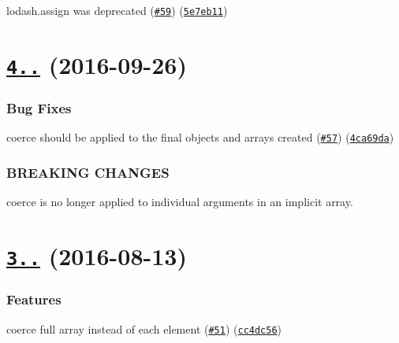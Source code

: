 \begin{DoxyItemize}
\item lodash.\+assign was deprecated (\href{https://github.com/yargs/yargs-parser/issues/59}{\tt \#59}) (\href{https://github.com/yargs/yargs-parser/commit/5e7eb11}{\tt 5e7eb11})
\end{DoxyItemize}

\label{_4.0.0}%
 \section*{\href{https://github.com/yargs/yargs-parser/compare/v3.2.0...v4.0.0}{\tt 4..} (2016-\/09-\/26)}

\subsubsection*{Bug Fixes}


\begin{DoxyItemize}
\item coerce should be applied to the final objects and arrays created (\href{https://github.com/yargs/yargs-parser/issues/57}{\tt \#57}) (\href{https://github.com/yargs/yargs-parser/commit/4ca69da}{\tt 4ca69da})
\end{DoxyItemize}

\subsubsection*{B\+R\+E\+A\+K\+I\+NG C\+H\+A\+N\+G\+ES}


\begin{DoxyItemize}
\item coerce is no longer applied to individual arguments in an implicit array.
\end{DoxyItemize}

\label{_3.2.0}%
 \section*{\href{https://github.com/yargs/yargs-parser/compare/v3.1.0...v3.2.0}{\tt 3..} (2016-\/08-\/13)}

\subsubsection*{Features}


\begin{DoxyItemize}
\item coerce full array instead of each element (\href{https://github.com/yargs/yargs-parser/issues/51}{\tt \#51}) (\href{https://github.com/yargs/yargs-parser/commit/cc4dc56}{\tt cc4dc56})
\end{DoxyItemize}

